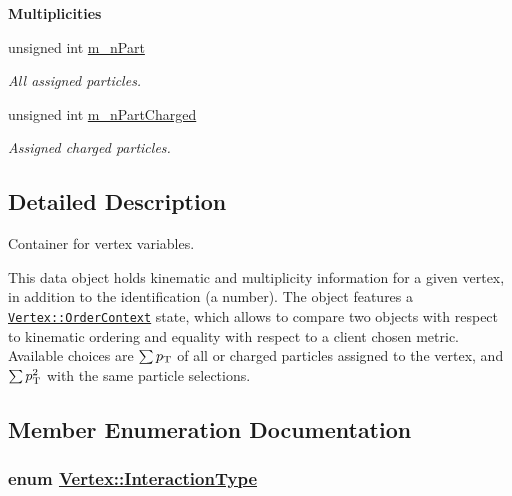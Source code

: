 \begin{Indent}{\bf Multiplicities}\par
\begin{CompactItemize}
\item 
\hypertarget{classVertex_8fbb44899dca4a7d65e03d2696e6012f}{
unsigned int \hyperlink{classVertex_8fbb44899dca4a7d65e03d2696e6012f}{m\_\-n\-Part}}
\label{classVertex_8fbb44899dca4a7d65e03d2696e6012f}

\begin{CompactList}\small\item\em All assigned particles. \item\end{CompactList}\item 
\hypertarget{classVertex_c49c15591f623bdb6a2c360519fb51c0}{
unsigned int \hyperlink{classVertex_c49c15591f623bdb6a2c360519fb51c0}{m\_\-n\-Part\-Charged}}
\label{classVertex_c49c15591f623bdb6a2c360519fb51c0}

\begin{CompactList}\small\item\em Assigned charged particles. \item\end{CompactList}\end{CompactItemize}
\end{Indent}


\subsection{Detailed Description}
Container for vertex variables. 

This data object holds kinematic and multiplicity information for a given vertex, in addition to the identification (a number). The object features a {\tt \hyperlink{classVertex_40a06cc3fde98913c8259e3c11cd37ec}{Vertex::Order\-Context}} state, which allows to compare two objects with respect to kinematic ordering and equality with respect to a client chosen metric. Available choices are $\sum{p_{\rm T}}$ of all or charged particles assigned to the vertex, and $\sum{p_{\rm T}^{2}}$ with the same particle selections. 



\subsection{Member Enumeration Documentation}
\hypertarget{classVertex_0d80a5c5ed3bd9be72a325aa448eca25}{
\subsubsection[InteractionType]{\setlength{\rightskip}{0pt plus 5cm}enum \hyperlink{classVertex_0d80a5c5ed3bd9be72a325aa448eca25}{Vertex::Interaction\-Type}}}
\label{classVertex_0d80a5c5ed3bd9be72a325aa448eca25}


